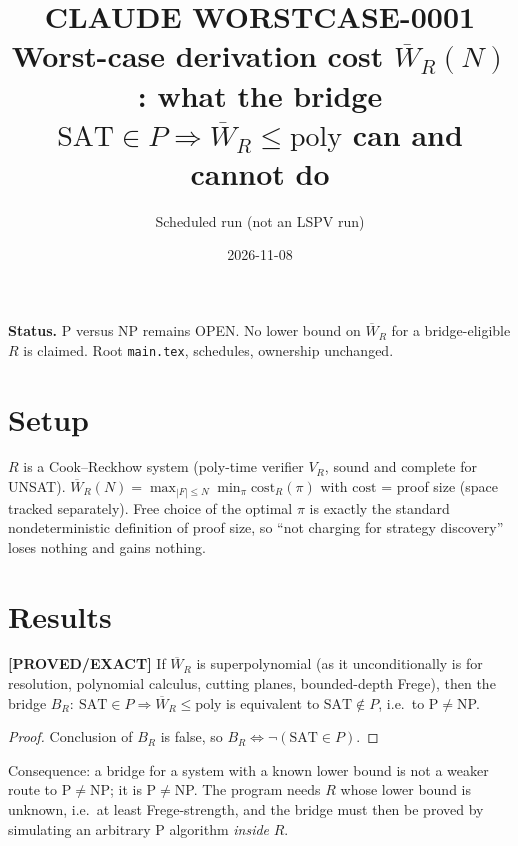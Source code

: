 \documentclass[11pt]{article}
\newcommand{\SAT}{\mathrm{SAT}}\newcommand{\status}[1]{\textbf{[#1]}}
\begin{document}
\title{CLAUDE WORSTCASE-0001\\\large Worst-case derivation cost $\overline W_R(N)$: what the bridge $\SAT\in P\Rightarrow \overline W_R\le\mathrm{poly}$ can and cannot do}
\author{Scheduled run (not an LSPV run)}\date{2026-11-08}\maketitle
\noindent\textbf{Status.} P versus NP remains OPEN. No lower bound on $\overline W_R$ for a bridge-eligible $R$ is claimed. Root \texttt{main.tex}, schedules, ownership unchanged.

\section*{Setup}
$R$ is a Cook--Reckhow system (poly-time verifier $V_R$, sound and complete for UNSAT). $\overline W_R(N)=\max_{|F|\le N}\min_\pi \mathrm{cost}_R(\pi)$ with $\mathrm{cost}$ = proof size (space tracked separately). Free choice of the optimal $\pi$ is exactly the standard nondeterministic definition of proof size, so ``not charging for strategy discovery'' loses nothing and gains nothing.

\section*{Results}
\begin{proposition} \status{PROVED/EXACT}
If $\overline W_R$ is superpolynomial (as it unconditionally is for resolution, polynomial calculus, cutting planes, bounded-depth Frege), then the bridge $B_R:\ \SAT\in P\Rightarrow\overline W_R\le\mathrm{poly}$ is equivalent to $\SAT\notin P$, i.e.\ to P$\neq$NP.
\end{proposition}
\begin{proof} Conclusion of $B_R$ is false, so $B_R\iff\neg(\SAT\in P)$. \end{proof}
Consequence: a bridge for a system with a known lower bound is not a weaker route to P$\ne$NP; it is P$\ne$NP. The program needs $R$ whose lower bound is unknown, i.e.\ at least Frege-strength, and the bridge must then be proved by simulating an arbitrary P algorithm \emph{inside} $R$.
\end{document}
